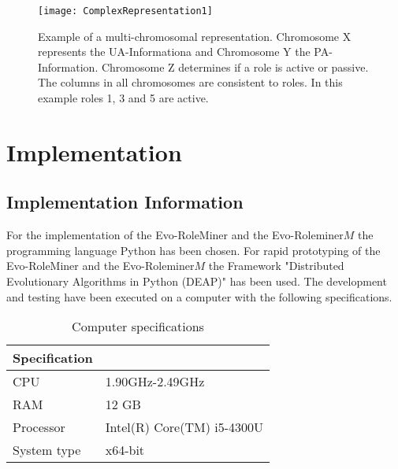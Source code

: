 	\begin{figure}[H]
		\centering
		\texttt{[image: ComplexRepresentation1]}
		\caption{Example of a multi-chromosomal representation. Chromosome X represents the UA-Informationa and Chromosome Y the PA-Information. Chromosome Z determines if a role is active or passive. The columns in all chromosomes are consistent to roles. In this example roles 1, 3 and 5 are active.}
		\label{fig:representation2}
	\end{figure}

\chapter{Implementation}
\section{Implementation Information}
	For the implementation of the Evo-RoleMiner and the Evo-Roleminer$M$ the programming language Python has been chosen. For rapid prototyping of the Evo-RoleMiner and the Evo-Roleminer$M$ the Framework "Distributed Evolutionary Algorithms in Python (DEAP)"\cite{DeRainville:2012} has been used. The development and testing have been executed on a computer with the following specifications.
	
	\begin{table}[H]
		\centering
		\caption{Computer specifications}
		\label{tab:specifications}
		\begin{tabular}{|l|l|}
			\hline
			\rowcolor[HTML]{EFEFEF} 
			Specification &                            \\ \hline
			CPU           & 1.90GHz-2.49GHz            \\ \hline
			RAM           & 12 GB                      \\ \hline
			Processor     & Intel(R) Core(TM) i5-4300U \\ \hline
			System type   & x64-bit                    \\ \hline
		\end{tabular}
	\end{table}
	
